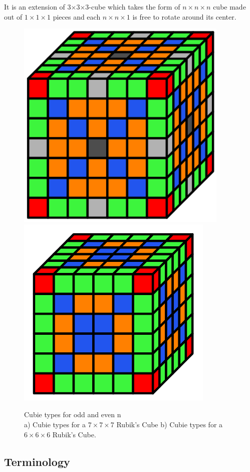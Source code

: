 \documentclass[12pt,a4paper]{article}
\theoremstyle{custom}
\newcommand{\Tthree}{3$\times$3$\times$3-}
\begin{document}
It is an extension of \Tthree cube which takes the form of $n\times n \times n$ cube made out of $1 \times 1\times 1$ pieces and each $n\times n \times 1$ is free to rotate around its center. 
\begin{figure}[H]
\centering
\includegraphics[scale=0.6]{7X7X7.png} \hspace*{2em}
\includegraphics[scale=0.66]{6X6X6.png}
\caption{Cubie types for odd and even n \cite{salkinder2021n} \\ a) Cubie types for a $7\times 7 \times 7$
Rubik’s Cube  b) Cubie types for a $6 \times 6 \times 6$ Rubik’s Cube. }
\label{nnn}
\end{figure}

\subsection{Terminology}
\end{document}
